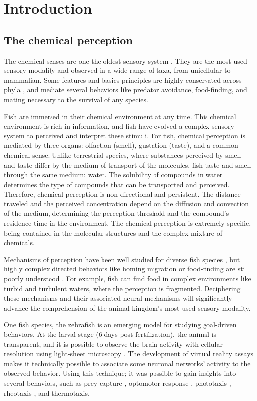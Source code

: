 \chapter{Introduction}

  \section{The chemical perception}
  The chemical senses are one the oldest sensory system \cite{yohe2018evolutionary}. They are the most used sensory modality and observed in a wide range of taxa, from unicellular \cite{bardwell2005walk} to mammalian. Some features and basics principles are highly conservated across phyla \cite{hildebrand1997mechanisms,yarmolinsky2009common}, and mediate several behaviors like predator avoidance, food-finding, and mating necessary to the survival of any species.

  Fish are immersed in their chemical environment at any time. This chemical environment is rich in information, and fish have evolved a complex sensory system to perceived and interpret these stimuli. For fish, chemical perception is mediated by three organs: olfaction (smell), gustation (taste), and a common chemical sense. Unlike terrestrial species, where substances perceived by smell and taste differ by the medium of transport of the molecules, fish taste and smell through the same medium: water. The solubility of compounds in water determines the type of compounds that can be transported and perceived. Therefore, chemical perception is non-directional and persistent. The distance traveled and the perceived concentration depend on the diffusion and convection of the medium, determining the perception threshold and the compound's residence time in the environment. The chemical perception is extremely specific, being contained in the molecular structures and the complex mixture of chemicals.

  Mechanisms of perception have been well studied for diverse fish species \cite{hara2012fish}, but highly complex directed behaviors like homing migration or food-finding are still poorly understood \cite{hansen2004chemosensory}. For example, fish can find food in complex environments like turbid and turbulent waters, where the perception is fragmented. Deciphering these mechanisms and their associated neural mechanisms will significantly advance the comprehension of the animal kingdom's most used sensory modality.

  One fish species, the zebrafish is an emerging model for studying goal-driven behaviors. At the larval stage (6 days post-fertilization), the animal is transparent, and it is possible to observe the brain activity with cellular resolution using light-sheet microscopy \cite{panier2013fast}. The development of virtual reality assays makes it technically possible to associate some neuronal networks' activity to the observed behavior. Using this technique; it was possible to gain insights into several behaviors, such as prey capture \cite{bianco2011prey}, optomotor response \cite{naumann2016whole}, phototaxis \cite{wolf2017sensorimotor}, rheotaxis \cite{olive2016rheotaxis}, and thermotaxis\cite{haesemeyer2019convergent}.

